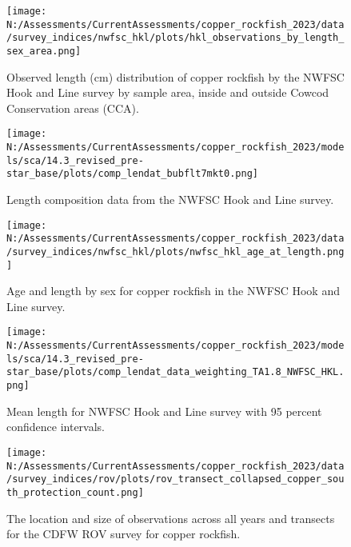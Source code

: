 \documentclass[11pt,
  english,
  letterpaper,
]{article}
\begin{document}
\pagebreak

\begin{figure}
\centering
\texttt{[image: N:/Assessments/CurrentAssessments/copper\_rockfish\_2023/data/survey\_indices/nwfsc\_hkl/plots/hkl\_observations\_by\_length\_sex\_area.png]}
\caption{Observed length (cm) distribution of copper rockfish by the NWFSC Hook and Line survey by sample area, inside and outside Cowcod Conservation areas (CCA).\label{fig:nwfsc-hkl-site-len}}
\end{figure}

\pagebreak

\begin{figure}
\centering
\texttt{[image: N:/Assessments/CurrentAssessments/copper\_rockfish\_2023/models/sca/14.3\_revised\_pre-star\_base/plots/comp\_lendat\_bubflt7mkt0.png]}
\caption{Length composition data from the NWFSC Hook and Line survey.\label{fig:hkl-len-data}}
\end{figure}

\pagebreak

\begin{figure}
\centering
\texttt{[image: N:/Assessments/CurrentAssessments/copper\_rockfish\_2023/data/survey\_indices/nwfsc\_hkl/plots/nwfsc\_hkl\_age\_at\_length.png]}
\caption{Age and length by sex for copper rockfish in the NWFSC Hook and Line survey.\label{fig:nwfsc-hkl-len-age}}
\end{figure}

\pagebreak

\begin{figure}
\centering
\texttt{[image: N:/Assessments/CurrentAssessments/copper\_rockfish\_2023/models/sca/14.3\_revised\_pre-star\_base/plots/comp\_lendat\_data\_weighting\_TA1.8\_NWFSC\_HKL.png]}
\caption{Mean length for NWFSC Hook and Line survey with 95 percent confidence intervals.\label{fig:mean-hkl-len-data}}
\end{figure}

\pagebreak

\begin{figure}
\centering
\texttt{[image: N:/Assessments/CurrentAssessments/copper\_rockfish\_2023/data/survey\_indices/rov/plots/rov\_transect\_collapsed\_copper\_south\_protection\_count.png]}
\caption{The location and size of observations across all years and transects for the CDFW ROV survey for copper rockfish.\label{fig:rov-obs-loc}}
\end{figure}
\end{document}
